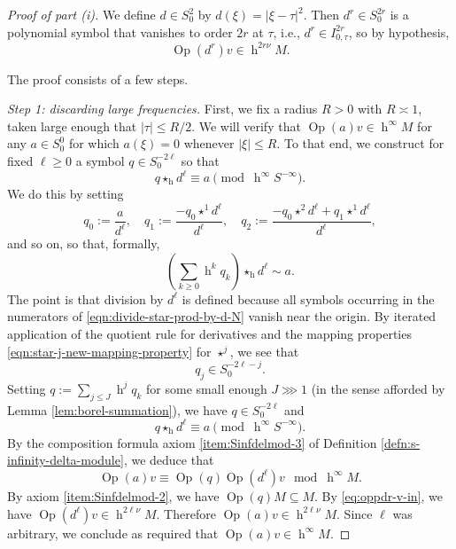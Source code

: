\documentclass[reqno]{amsart}
\DeclareMathOperator{\h}{h}
\DeclareMathOperator{\Opp}{Op}
\theoremstyle{plain} \newtheorem{theorem} {Theorem}
\theoremstyle{definition} \newtheorem{definition} [theorem] {Definition}
\theoremstyle{itplain} %
\numberwithin{equation}{section}
\numberwithin{theorem}{section}
\renewcommand{\geq}{\geqslant}
\renewcommand{\leq}{\leqslant}
\begin{document}
\begin{proof}[Proof of part (i)]
  We define $d \in S^2_0$ by $d(\xi) = |\xi - \tau|^2$.  Then $d^r \in S^{2 r}_0$ is a polynomial symbol that vanishes to order $2 r$ at $\tau$, i.e., $d^r \in I_{0,\tau}^{2 r}$, so by hypothesis,
  \begin{equation}\label{eq:oppdr-v-in}
    \Opp(d^r) v \in \h^{2 r \nu } M.
\end{equation}

  The proof consists of a few steps.

  \emph{Step 1: discarding large frequencies.}  First, we fix a radius $R > 0$ with $R \asymp 1$, taken large enough that $|\tau| \leq R/2$.  We will verify that $\Opp(a) v \in \h^\infty M$ for any $a \in S^0_0$ for which $a(\xi) = 0$ whenever $|\xi| \leq R$.  To that end, we construct for fixed $\ell \geq 0$ a symbol $q \in S^{-2 \ell}_0$ so that
  \[
    q \star_{\h} d^{\ell} \equiv a\pmod{ \h^\infty S^{-\infty} }.
  \]
  We do this by setting
  \begin{equation}\label{eqn:divide-star-prod-by-d-N}
    q_0 :=
    \frac{
      a
    }{
      d^\ell
    },
    \quad
    q_1 := \frac{- q_0 \star^1 d^\ell }{d^\ell},
    \quad
    q_2 :=
    \frac{- q_0 \star^2 d^\ell
      + q_1 \star^1 d^\ell
    }{
      d^\ell
    },
  \end{equation}
  and so on, so that, formally,
  \[
    (\sum_{k \geq 0} \h^k q_k) \star_{\h} d^\ell \sim a.
  \]
  The point is that division by $d^\ell$ is defined because all symbols occurring in the numerators of \eqref{eqn:divide-star-prod-by-d-N} vanish near the origin.  By iterated application of the quotient rule for derivatives and the mapping properties \eqref{eqn:star-j-new-mapping-property} for $\star^j$, we see that
  \begin{equation*}
    q_j \in S^{-2 \ell-j}_0.
  \end{equation*}
  Setting $q := \sum_{j \leq J} \h^j q_k$ for some small enough $J \ggg 1$ (in the sense afforded by Lemma \ref{lem:borel-summation}), we have $q \in S^{-2 \ell}_0$ and
  \begin{equation}\label{eqn:q-star-d-N-equiv-1-minus-a}
    q \star_{\h} d^\ell \equiv a \pmod{\h^\infty S^{-\infty}}.
  \end{equation}
  By the composition formula axiom \eqref{item:Sinfdelmod-3} of Definition \ref{defn:s-infinity-delta-module}, we deduce that
  \begin{equation}\label{eqn:composition-formula-appl-to-v-minus-opp-a-v}
    \Opp(a) v
    \equiv
    \Opp(q) \Opp(d^\ell) v \mod{\h^\infty M}.
  \end{equation}
  By axiom \eqref{item:Sinfdelmod-2}, we have $\Opp(q) M \subseteq M$.  By \eqref{eq:oppdr-v-in}, we have $\Opp(d^\ell) v \in \h^{2 \ell \nu} M$.  Therefore $\Opp(a) v \in \h^{2 \ell \nu} M$.  Since $\ell$ was arbitrary, we conclude as required that $\Opp(a) v \in \h^\infty M$.


\end{proof}
\end{document}
